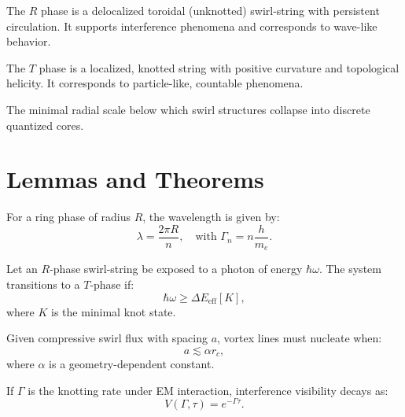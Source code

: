 \documentclass[11pt,a4paper]{article}
\begin{document}
    \begin{definition}
    The $R$ phase is a delocalized toroidal (unknotted) swirl-string with persistent circulation. It supports interference phenomena and corresponds to wave-like behavior.
    \end{definition}

    \begin{definition}
    The $T$ phase is a localized, knotted string with positive curvature and topological helicity. It corresponds to particle-like, countable phenomena.
    \end{definition}

    \begin{definition}
    The minimal radial scale below which swirl structures collapse into discrete quantized cores.
    \end{definition}

\section{Lemmas and Theorems}

    \begin{lemma}
    \label{lem:debroglie}
    For a ring phase of radius $R$, the wavelength is given by:
    \[
        \lambda = \frac{2\pi R}{n}, \quad \text{with } \Gamma_n = n\frac{h}{m_e}.
    \]
    \end{lemma}

    \begin{theorem}
    \label{thm:rt-transition}
    Let an $R$-phase swirl-string be exposed to a photon of energy $\hbar\omega$. The system transitions to a $T$-phase if:
    \[
        \hbar\omega \geq \Delta E_{\text{eff}}[K],
    \]
    where $K$ is the minimal knot state.
    \end{theorem}

    \begin{theorem}
    \label{thm:nucleation}
    Given compressive swirl flux with spacing $a$, vortex lines must nucleate when:
    \[
        a \lesssim \alpha r_c,
    \]
    where $\alpha$ is a geometry-dependent constant.
    \end{theorem}

    \begin{corollary}
    \label{cor:fringe}
    If $\Gamma$ is the knotting rate under EM interaction, interference visibility decays as:
    \[
        V(\Gamma, \tau) = e^{-\Gamma \tau}.
    \]
    \end{corollary}
\end{document}
